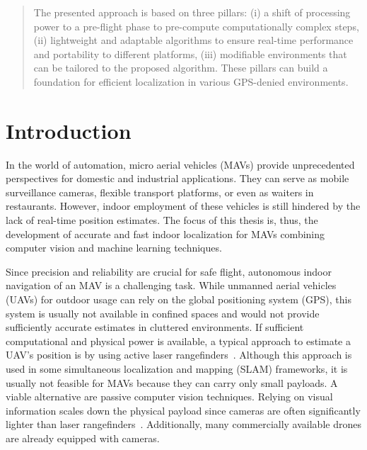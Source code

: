 \documentclass{report}
\begin{document}
\begin{abstract}

  The presented approach is based on three pillars: (i) a shift of
  processing power to a pre-flight phase to pre-compute
  computationally complex steps, (ii) lightweight and adaptable
  algorithms to ensure real-time performance and portability to
  different platforms, (iii) modifiable environments that can be
  tailored to the proposed algorithm. These pillars can build a
  foundation for efficient localization in various GPS-denied
  environments.
\end{abstract}
\chapter{Introduction}
\label{chap:introduction}

In the world of automation, micro aerial vehicles (MAVs) provide
unprecedented perspectives for domestic and industrial
applications. They can serve as mobile surveillance cameras, flexible
transport platforms, or even as waiters in restaurants. However,
indoor employment of these vehicles is still hindered by the lack of
real-time position estimates. The focus of this thesis is, thus, the
development of accurate and fast indoor localization for MAVs
combining computer vision and machine learning techniques.


Since precision and reliability are crucial for safe flight,
autonomous indoor navigation of an MAV is a challenging task. While
unmanned aerial vehicles (UAVs) for outdoor usage can rely on the
global positioning system (GPS), this system is usually not available
in confined spaces and would not provide sufficiently accurate
estimates in cluttered environments.  If sufficient computational and
physical power is available, a typical approach to estimate a UAV's
position is by using active laser
rangefinders~\cite{grzonka2009towards,bachrach2009autonomous}.
Although this approach is used in some simultaneous localization and
mapping (SLAM) frameworks, it is usually not feasible for MAVs because
they can carry only small payloads. A viable alternative are passive
computer vision techniques. Relying on visual information scales down
the physical payload since cameras are often significantly lighter
than laser
rangefinders~\cite{blosch2010vision,angeli20062d,ahrens2009vision}.
Additionally, many commercially available drones are already equipped
with cameras.
\end{document}
